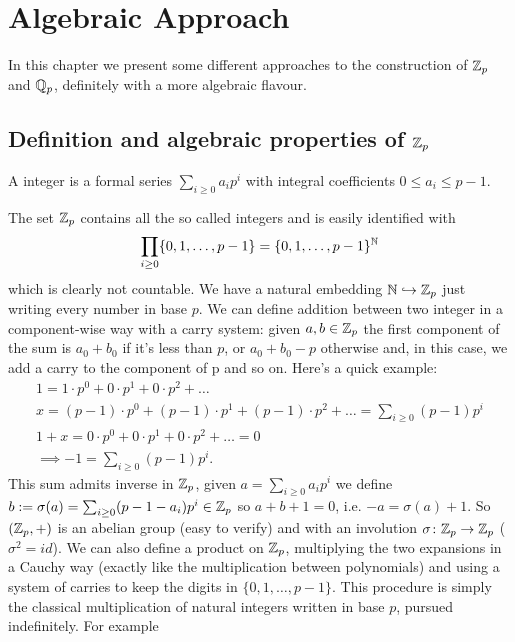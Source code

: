 \chapter{Algebraic Approach}
	In this chapter we present some different approaches to the construction of $\mathbb{Z}_p$ and $\mathbb{Q}_p$, definitely with a more algebraic flavour. 
	\section{Definition and algebraic properties of $\mathbb{Z}_p$}
		\label{section:Zp}
		\begin{defn}
			A \padic integer is a formal series $\sum_{i \geq 0} a_ip^i$ with integral coefficients $0 \leq a_i \leq p-1$.
		\end{defn}	
		The set $\mathbb{Z}_p$ contains all the so called \padic integers and is easily identified with 
		\[
			\prod_{i\geq0} \{0, 1, \dots, p-1\} = \{0, 1, \dots, p-1\}^{\mathbb{N}}
		\]
		which is clearly not countable. We have a natural embedding $\mathbb{N} \hookrightarrow \mathbb{Z}_p$ just writing every number in base $p$.\newline
		We can define addition between two \padic integer in a component-wise way with a carry system: given $a, b \in \mathbb{Z}_p$ the first component of the sum is $a_0 + b_0$ if it's less than $p$, or $a_0 + b_0 - p$ otherwise and, in this case, we add a carry to the component of p and so on. Here's a quick example:
		\begin{gather*}
			1 = 1\cdot p^0 + 0\cdot p^1 + 0 \cdot p^2 + \dots \\
			x = (p - 1)\cdot p^0 + (p-1)\cdot p^1 + (p-1)\cdot p^2 + \dots = \sum_{i\geq 0}(p-1)p^i\\
			1 + x = 0\cdot p^0 + 0\cdot p^1 + 0\cdot p^2 + \dots = 0\\
			\implies -1 = \sum_{i\geq 0}(p-1)p^i.
		\end{gather*} 
		This sum admits inverse in $\mathbb{Z}_p$, given $a = \sum_{i\geq0} a_ip^i$ we define $b := \sigma(a) = \sum_{i\geq0}(p - 1 - a_i)p^i \in \mathbb{Z}_p$ so $a + b + 1 = 0$, i.e. $-a = \sigma(a) + 1$. So $(\mathbb{Z}_p, +)$ is an abelian group (easy to verify) and with an involution $\sigma\colon \mathbb{Z}_p \to \mathbb{Z}_p$ ($\sigma^2 = id$). \newline
		We can also define a product on $\mathbb{Z}_p$, multiplying the two expansions in a Cauchy way (exactly like the multiplication between polynomials) and using a system of carries to keep the digits in $\{0, 1, \dots, p-1\}$. This procedure is simply the classical multiplication of natural integers written in base $p$, pursued indefinitely. For example
